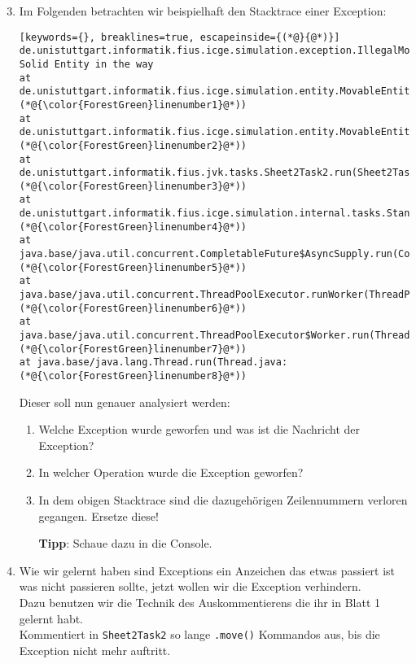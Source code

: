 \begin{enumerate}[label=\alph*)] \setcounter{enumi}{2}
    \item Im Folgenden betrachten wir beispielhaft den Stacktrace einer Exception:
        \begin{lstlisting}[keywords={}, breaklines=true, escapeinside={(*@}{@*)}]
de.unistuttgart.informatik.fius.icge.simulation.exception.IllegalMoveException: Solid Entity in the way
at de.unistuttgart.informatik.fius.icge.simulation.entity.MovableEntity.internalMove(MovableEntity.java:(*@{\color{ForestGreen}linenumber1}@*))
at de.unistuttgart.informatik.fius.icge.simulation.entity.MovableEntity.move(MovableEntity.java:(*@{\color{ForestGreen}linenumber2}@*))
at de.unistuttgart.informatik.fius.jvk.tasks.Sheet2Task2.run(Sheet2Task2.java:(*@{\color{ForestGreen}linenumber3}@*))
at de.unistuttgart.informatik.fius.icge.simulation.internal.tasks.StandardTaskRunner.executeTask(StandardTaskRunner.java:(*@{\color{ForestGreen}linenumber4}@*))
at java.base/java.util.concurrent.CompletableFuture$AsyncSupply.run(CompletableFuture.java:(*@{\color{ForestGreen}linenumber5}@*))
at java.base/java.util.concurrent.ThreadPoolExecutor.runWorker(ThreadPoolExecutor.java:(*@{\color{ForestGreen}linenumber6}@*))
at java.base/java.util.concurrent.ThreadPoolExecutor$Worker.run(ThreadPoolExecutor.java:(*@{\color{ForestGreen}linenumber7}@*))
at java.base/java.lang.Thread.run(Thread.java:(*@{\color{ForestGreen}linenumber8}@*))
        \end{lstlisting}

        Dieser soll nun genauer analysiert werden:

        \begin{enumerate}
            \item[i)] Welche Exception wurde geworfen und was ist die Nachricht der Exception?
            \item[ii)] In welcher Operation wurde die Exception geworfen?
            \item[iii)] In dem obigen Stacktrace sind die dazugehörigen Zeilennummern verloren gegangen. Ersetze diese!

            \textbf{Tipp}: Schaue dazu in die Console.
        \end{enumerate}

    \item Wie wir gelernt haben sind Exceptions ein Anzeichen das etwas passiert ist was nicht passieren sollte, jetzt wollen wir die Exception verhindern.\\
        Dazu benutzen wir die Technik des Auskommentierens die ihr in Blatt 1 gelernt habt.\\
        Kommentiert in \lstinline{Sheet2Task2} so lange \lstinline{.move()} Kommandos aus, bis die Exception nicht mehr auftritt.


\end{enumerate}
